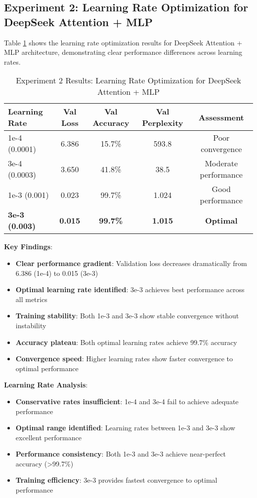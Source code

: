 \documentclass[11pt,a4paper]{article}
\begin{document}
\subsection{Experiment 2: Learning Rate Optimization for DeepSeek Attention + MLP}

Table \ref{tab:exp2_results} shows the learning rate optimization results for DeepSeek Attention + MLP architecture, demonstrating clear performance differences across learning rates.

\begin{table}[H]
\centering
\caption{Experiment 2 Results: Learning Rate Optimization for DeepSeek Attention + MLP}
\label{tab:exp2_results}
\begin{tabular}{@{}lcccc@{}}
\toprule
Learning Rate & Val Loss & Val Accuracy & Val Perplexity & Assessment \\
\midrule
1e-4 (0.0001) & 6.386 & 15.7\% & 593.8 & Poor convergence \\
3e-4 (0.0003) & 3.650 & 41.8\% & 38.5 & Moderate performance \\
1e-3 (0.001) & 0.023 & 99.7\% & 1.024 & Good performance \\
\textbf{3e-3 (0.003)} & \textbf{0.015} & \textbf{99.7\%} & \textbf{1.015} & \textbf{Optimal} \\
\bottomrule
\end{tabular}
\end{table}

\textbf{Key Findings}:
\begin{itemize}
    \item \textbf{Clear performance gradient}: Validation loss decreases dramatically from 6.386 (1e-4) to 0.015 (3e-3)
    \item \textbf{Optimal learning rate identified}: 3e-3 achieves best performance across all metrics
    \item \textbf{Training stability}: Both 1e-3 and 3e-3 show stable convergence without instability
    \item \textbf{Accuracy plateau}: Both optimal learning rates achieve 99.7\% accuracy
    \item \textbf{Convergence speed}: Higher learning rates show faster convergence to optimal performance
\end{itemize}

\textbf{Learning Rate Analysis}:
\begin{itemize}
    \item \textbf{Conservative rates insufficient}: 1e-4 and 3e-4 fail to achieve adequate performance
    \item \textbf{Optimal range identified}: Learning rates between 1e-3 and 3e-3 show excellent performance
    \item \textbf{Performance consistency}: Both 1e-3 and 3e-3 achieve near-perfect accuracy (>99.7\%)
    \item \textbf{Training efficiency}: 3e-3 provides fastest convergence to optimal performance
\end{itemize}
\end{document}
